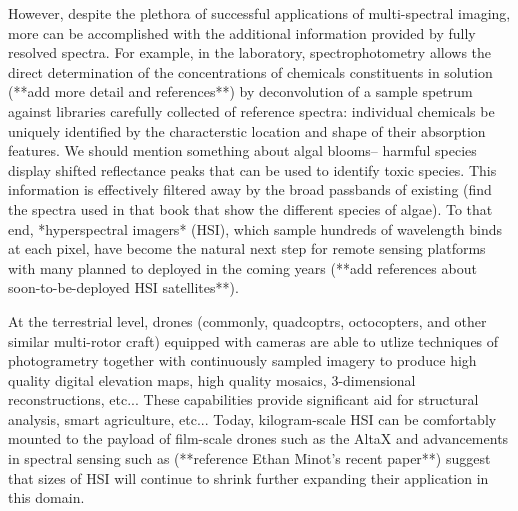 However, despite the plethora of successful applications of multi-spectral imaging, more can be accomplished with the additional information provided by fully resolved spectra. For example, in the laboratory, spectrophotometry allows the direct determination of the concentrations of chemicals constituents in solution (**add more detail and references**) by deconvolution of a sample spetrum against libraries carefully collected of reference spectra: individual chemicals be uniquely identified by the characterstic location and shape of their absorption features. We should mention something about algal blooms-- harmful species display shifted reflectance peaks that can be used to identify toxic species. This information is effectively filtered away by the broad passbands of existing (find the spectra used in that book that show the different species of algae). To that end, *hyperspectral imagers* (HSI), which sample hundreds of wavelength binds at each pixel, have become the natural next step for remote sensing platforms with many planned to deployed in the coming years (**add references about soon-to-be-deployed HSI satellites**). 


At the terrestrial level, drones (commonly, quadcoptrs, octocopters, and other similar multi-rotor craft) equipped with cameras are able to utlize techniques of photogrametry together with continuously sampled imagery to produce high quality digital elevation maps, high quality mosaics, 3-dimensional reconstructions, etc... These capabilities provide significant aid for structural analysis, smart agriculture, etc... Today, kilogram-scale HSI can be comfortably mounted to the payload of film-scale drones such as the AltaX and advancements in spectral sensing such as (**reference Ethan Minot's recent paper**) suggest that sizes of HSI will continue to shrink further expanding their application in this domain. 

